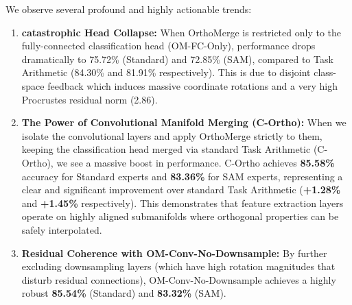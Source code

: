 \documentclass{article}
\begin{document}
We observe several profound and highly actionable trends:
\begin{enumerate}
    \item \textbf{catastrophic Head Collapse:} When OrthoMerge is restricted only to the fully-connected classification head (OM-FC-Only), performance drops dramatically to 75.72\% (Standard) and 72.85\% (SAM), compared to Task Arithmetic (84.30\% and 81.91\% respectively). This is due to disjoint class-space feedback which induces massive coordinate rotations and a very high Procrustes residual norm (2.86).
    \item \textbf{The Power of Convolutional Manifold Merging (C-Ortho):} When we isolate the convolutional layers and apply OrthoMerge strictly to them, keeping the classification head merged via standard Task Arithmetic (C-Ortho), we see a massive boost in performance. C-Ortho achieves \textbf{85.58\%} accuracy for Standard experts and \textbf{83.36\%} for SAM experts, representing a clear and significant improvement over standard Task Arithmetic (\textbf{+1.28\%} and \textbf{+1.45\%} respectively). This demonstrates that feature extraction layers operate on highly aligned submanifolds where orthogonal properties can be safely interpolated.
    \item \textbf{Residual Coherence with OM-Conv-No-Downsample:} By further excluding downsampling layers (which have high rotation magnitudes that disturb residual connections), OM-Conv-No-Downsample achieves a highly robust \textbf{85.54\%} (Standard) and \textbf{83.32\%} (SAM).
\end{enumerate}
\end{document}

